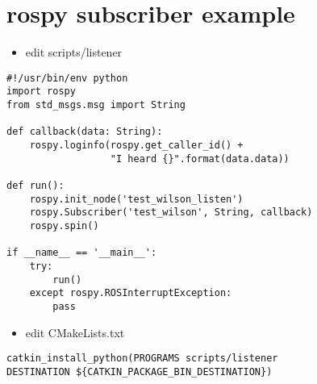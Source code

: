 \documentclass{article}
\begin{document}
\section{rospy subscriber example}
\begin{itemize}
    \item edit scripts/listener
\end{itemize}
\begin{lstlisting}
#!/usr/bin/env python
import rospy
from std_msgs.msg import String

def callback(data: String):
    rospy.loginfo(rospy.get_caller_id() + 
                  "I heard {}".format(data.data))

def run():
    rospy.init_node('test_wilson_listen')
    rospy.Subscriber('test_wilson', String, callback)
    rospy.spin()

if __name__ == '__main__':
    try:
        run()
    except rospy.ROSInterruptException:
        pass
\end{lstlisting}
\begin{itemize}
    \item edit CMakeLists.txt
\end{itemize}
\begin{lstlisting}
catkin_install_python(PROGRAMS scripts/listener 
DESTINATION ${CATKIN_PACKAGE_BIN_DESTINATION})
\end{lstlisting}
\end{document}
